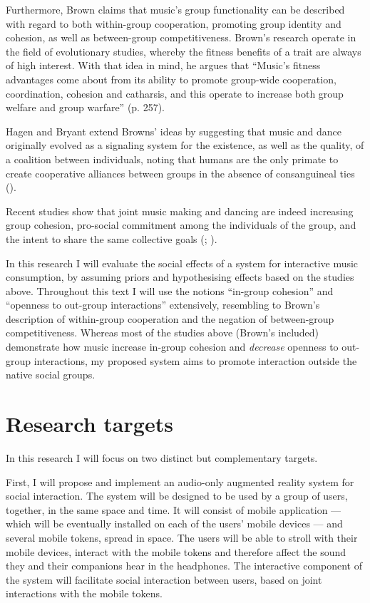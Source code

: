 \documentclass[a4paper,11pt]{article}
\begin{document}
Furthermore, Brown claims that music's group functionality can be described with regard to both within-group cooperation, promoting group identity and cohesion, as well as between-group competitiveness.
Brown's research operate in the field of evolutionary studies, whereby the fitness benefits of a trait are always of high interest.
With that idea in mind, he argues that ``Music's fitness advantages come about from its ability to promote group-wide cooperation, coordination, cohesion and catharsis, and this operate to increase both group welfare and group warfare'' (p. 257).

Hagen and Bryant extend Browns' ideas by suggesting that music and dance originally evolved as a signaling system for the existence, as well as the quality, of a coalition between individuals, noting that humans are the only primate to create cooperative alliances between groups in the absence of consanguineal ties (\cite*{Hagen2003}).

Recent studies show that joint music making and dancing are indeed increasing group cohesion, pro-social commitment among the individuals of the group, and the intent to share the same collective goals (\cite{Kirschner2010}; \cite{Knoblich2011}).

In this research I will evaluate the social effects of a system for interactive music consumption, by assuming priors and hypothesising effects based on the studies above.
Throughout this text I will use the notions ``in-group cohesion'' and ``openness to out-group interactions'' extensively, resembling to Brown's description of within-group cooperation and the negation of between-group competitiveness.
Whereas most of the studies above (Brown's included) demonstrate how music increase in-group cohesion and \emph{decrease} openness to out-group interactions, my proposed system aims to promote interaction outside the native social groups.

\section{Research targets}

In this research I will focus on two distinct but complementary targets.

First, I will propose and implement an audio-only augmented reality system for social interaction.
The system will be designed to be used by a group of users, together, in the same space and time.
It will consist of mobile application --- which will be eventually installed on each of the users' mobile devices --- and several mobile tokens, spread in space.
The users will be able to stroll with their mobile devices, interact with the mobile tokens and therefore affect the sound they and their companions hear in the headphones.
The interactive component of the system will facilitate social interaction between users, based on joint interactions with the mobile tokens.
\end{document}
